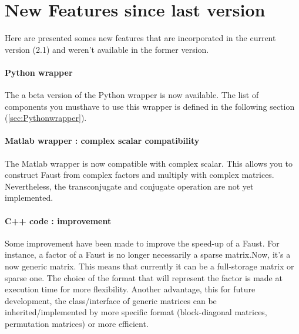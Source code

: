 \section{New Features since last version}\label{sec: RequiredTools}

Here are presented somes new features that are incorporated in the current version (2.1) and weren't available in the former version.

\paragraph{Python wrapper}
The a beta version of the Python wrapper is now available.
The list of components you musthave to use this wrapper is defined in the following section (\ref{sec:Pythonwrapper}).



\paragraph{Matlab wrapper : complex scalar compatibility}
The Matlab wrapper is now compatible with complex scalar.
This allows you to construct Faust from complex factors
and multiply with complex matrices.
Nevertheless, the transconjugate and conjugate operation are not yet implemented. 

\paragraph{C++ code : improvement}
Some improvement have been made to improve the speed-up of a Faust. For instance, a factor of a Faust is no longer necessarily a sparse matrix.Now, it's a  now generic matrix.
This means that currently it can be a full-storage matrix or sparse one. The choice of the format that will represent the factor is made at execution time for more flexibility.
Another advantage, this for future development, the class/interface of generic matrices can be inherited/implemented by more specific format (block-diagonal matrices, permutation matrices) or more efficient. 